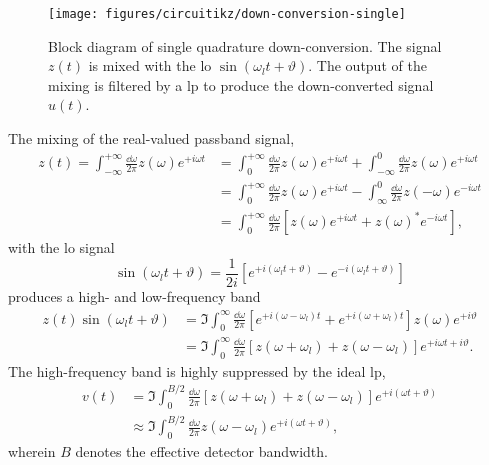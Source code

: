 \begin{figure}[htb]
	\centering
	\texttt{[image: figures/circuitikz/down-conversion-single]}
	\caption{Block diagram of single quadrature down-conversion. The signal $z(t)$ is mixed with the \gls{lo} $\sin(\omega_lt+\vartheta)$. The output of the mixing is filtered by a \gls{lp} to produce the down-converted signal $u(t)$.}\label{fig:down_conversion_single}
\end{figure}
The mixing of the real-valued passband signal,
\begin{equation}
	\begin{split}
		z(t)
		=
		\int_{-\infty}^{+\infty}\frac{\dd{\omega}}{2\pi}
		z(\omega)
		e^{+i\omega t}
		&=
		\int_0^{+\infty}\frac{\dd{\omega}}{2\pi}
		z(\omega)
		e^{+i\omega t}
		+
		\int_{-\infty}^0\frac{\dd{\omega}}{2\pi}
		z(\omega)
		e^{+i\omega t}
		\\
		&=
		\int_0^{+\infty}\frac{\dd{\omega}}{2\pi}
		z(\omega)
		e^{+i\omega t}
		-
		\int_{\infty}^0\frac{\dd{\omega}}{2\pi}
		z(-\omega)
		e^{-i\omega t}
		\\
		&=
		\int_0^{+\infty}\frac{\dd{\omega}}{2\pi}
		\left[
			z(\omega)
			e^{+i\omega t}
			+
			z(\omega)^*
			e^{-i\omega t}
		\right]
		,
	\end{split}
\end{equation}
with the \gls{lo} signal
\begin{equation}
	\sin(\omega_lt+\vartheta)
	=
	\frac{1}{2i}
	\left[
		e^{+i(\omega_lt+\vartheta)}
		-
		e^{-i(\omega_lt+\vartheta)}
	\right]
\end{equation}
produces a high- and low-frequency band
\begin{equation}
	\begin{split}
		z(t)
		\sin(\omega_lt+\vartheta)
		&=
		\Im
		\int_0^\infty\frac{\dd{\omega}}{2\pi}
		\left[
			e^{+i(\omega-\omega_l)t}
			+
			e^{+i(\omega+\omega_l)t}
		\right]
		z(\omega)
		e^{+i\vartheta}
		\\
		&=
		\Im
		\int_0^\infty\frac{\dd{\omega}}{2\pi}
		\left[
			z(\omega+\omega_l)
			+
			z(\omega-\omega_l)
		\right]
		e^{+i\omega t+i\vartheta}
		.
	\end{split}
\end{equation}
The high-frequency band is highly suppressed by the ideal \gls{lp},
\begin{equation}
	\begin{split}
		v(t)
		&=
		\Im
		\int_0^{B/2}\frac{\dd{\omega}}{2\pi}
		\left[
			z(\omega+\omega_l)
			+
			z(\omega-\omega_l)
		\right]
		e^{+i(\omega t+\vartheta)}
		\\
		&\approx
		\Im
		\int_0^{B/2}\frac{\dd{\omega}}{2\pi}
		z(\omega-\omega_l)
		e^{+i(\omega t+\vartheta)}
		,
	\end{split}
	\label{eq:down_conversion_imag}
\end{equation}
wherein $B$ denotes the effective detector bandwidth.


